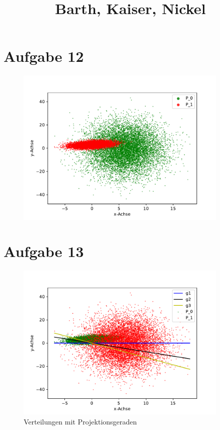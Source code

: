 

\subject{Blatt 4}
\title{Barth, Kaiser, Nickel}



\maketitle
\thispagestyle{empty}


\section{Aufgabe 12}
\begin{figure}[H]
  \centering
  \includegraphics[width=0.9\textwidth]{12b.pdf}
  \caption{}
\end{figure}



\section{Aufgabe 13}

\begin{figure}[H]
  \centering
  \includegraphics[width=0.9\textwidth]{13_a.pdf}
  \caption{Verteilungen mit Projektionsgeraden}
\end{figure}

